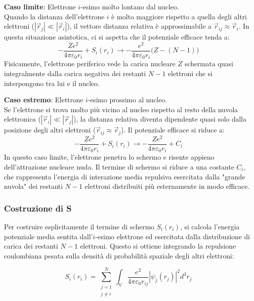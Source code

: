 \textbf{Caso limite}: Elettrone \( i \)-esimo molto lontano dal nucleo.\\
Quando la distanza dell'elettrone \( i \) è molto maggiore rispetto a quella degli altri elettroni (\( |\vec{r}_j| \ll |\vec{r}_i| \)), il vettore distanza relativa è approssimabile a \( \vec{r}_{ij} \approx \vec{r}_i \). In questa situazione asintotica, ci si aspetta che il potenziale efficace tenda a:
\begin{equation}
    -\frac{Ze^2}{4\pi\varepsilon_0 r_i} + S_i(r_i) \longrightarrow -\frac{e^2}{4\pi\varepsilon_0 r_i} \big( Z - (N - 1) \big)
\end{equation}
Fisicamente, l'elettrone periferico vede la carica nucleare \( Z \) schermata quasi integralmente dalla carica negativa dei restanti \( N-1 \) elettroni che si interpongono tra lui e il nucleo.

\textbf{Caso estremo}: Elettrone \( i \)-esimo prossimo al nucleo.\\
Se l'elettrone si trova molto più vicino al nucleo rispetto al resto della nuvola elettronica (\( |\vec{r}_i| \ll |\vec{r}_j| \)), la distanza relativa diventa dipendente quasi solo dalla posizione degli altri elettroni (\( \vec{r}_{ij} \approx \vec{r}_j \)). Il potenziale efficace si riduce a:
\begin{equation}
    -\frac{Ze^2}{4\pi\varepsilon_0 r_i} + S_i(r_i) \longrightarrow -\frac{Ze^2}{4\pi\varepsilon_0 r_i} + C_i
\end{equation}
In questo caso limite, l'elettrone penetra lo schermo e risente appieno dell'attrazione nucleare nuda. Il termine di schermo si riduce a una costante \( C_i \), che rappresenta l'energia di interazione media repulsiva esercitata dalla "grande nuvola" dei restanti \( N-1 \) elettroni distribuiti più esternamente in modo efficace.

\subsubsection{Costruzione di S}

Per costruire esplicitamente il termine di schermo \( S_i(r_i) \), si calcola l'energia potenziale media sentita dall'\( i \)-esimo elettrone ed esercitata dalla distribuzione di carica dei restanti \( N-1 \) elettroni. Questo si ottiene integrando la repulsione coulombiana pesata sulla densità di probabilità spaziale degli altri elettroni:

\begin{equation}
    S_i(r_i) = \sum_{\substack{j=1 \\ j \neq i}}^{N} \int_V \frac{e^2}{4\pi\varepsilon_0 r_{ij}} |\psi_j(r_j)|^2 d^3 r_j
\end{equation}


